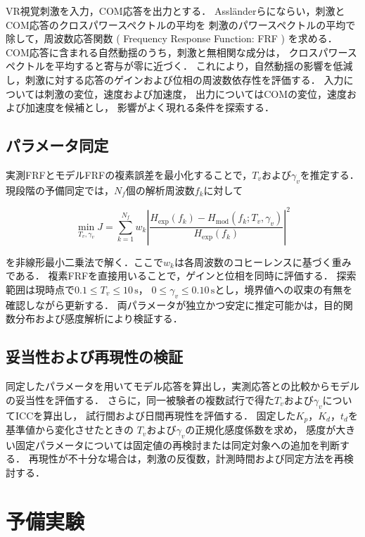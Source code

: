 \documentclass[a4paper,9pt,twocolumn]{ltjsarticle}
\begin{document}
VR視覚刺激を入力，COM応答を出力とする．
Assl\"anderら\cite{asslaender2025}にならい，刺激とCOM応答のクロスパワースペクトルの平均を
刺激のパワースペクトルの平均で除して，周波数応答関数 ( Frequency Response Function: FRF ) を求める．
COM応答に含まれる自然動揺のうち，刺激と無相関な成分は，
クロスパワースペクトルを平均すると寄与が零に近づく．
これにより，自然動揺の影響を低減し，刺激に対する応答のゲインおよび位相の周波数依存性を評価する．
入力については刺激の変位，速度および加速度，
出力についてはCOMの変位，速度および加速度を候補とし，
影響がよく現れる条件を探索する．

\subsection{パラメータ同定}

実測FRFとモデルFRFの複素誤差を最小化することで，$T_v$および$\gamma_v$を推定する．
現段階の予備同定では，$N_f$個の解析周波数$f_k$に対して

\begin{equation}
  \min_{T_v,\gamma_v} J
  =\sum_{k=1}^{N_f}w_k
  \left|
  \frac{H_{\mathrm{exp}}(f_k)-H_{\mathrm{mod}}(f_k;T_v,\gamma_v)}
  {H_{\mathrm{exp}}(f_k)}
  \right|^2
  \label{eq:objective}
\end{equation}

を非線形最小二乗法で解く．ここで$w_k$は各周波数のコヒーレンスに基づく重みである．
複素FRFを直接用いることで，ゲインと位相を同時に評価する．
探索範囲は現時点で$0.1\leq T_v\leq10\,\mathrm{s}$，
$0\leq\gamma_v\leq0.10\,\mathrm{s}$とし，境界値への収束の有無を確認しながら更新する．
両パラメータが独立かつ安定に推定可能かは，目的関数分布および感度解析により検証する．

\subsection{妥当性および再現性の検証}

同定したパラメータを用いてモデル応答を算出し，実測応答との比較からモデルの妥当性を評価する．
さらに，同一被験者の複数試行で得た$T_v$および$\gamma_v$についてICCを算出し，
試行間および日間再現性を評価する．
固定した$K_p$，$K_d$，$t_d$を基準値から変化させたときの
$T_v$および$\gamma_v$の正規化感度係数を求め，
感度が大きい固定パラメータについては固定値の再検討または同定対象への追加を判断する．
再現性が不十分な場合は，刺激の反復数，計測時間および同定方法を再検討する．

\section{予備実験}
\end{document}
